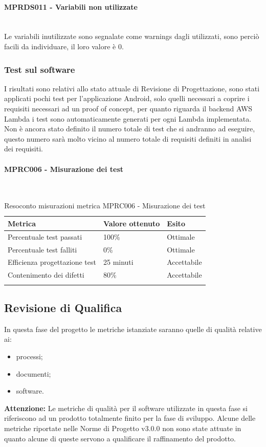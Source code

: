 \paragraph{MPRDS011 - Variabili non utilizzate}\mbox{}\\[0.4cm]
Le variabili inutilizzate sono segnalate come warnings dagli  utilizzati, sono perciò facili da individuare, il loro valore è 0.
\subsubsection{Test sul software}
I risultati sono relativi allo stato attuale di Revisione di Progettazione, sono stati applicati pochi test per l'applicazione Android, solo quelli necessari a coprire i requisiti necessari ad un proof of concept, per quanto riguarda il backend AWS Lambda i test sono automaticamente generati per ogni Lambda implementata. Non è ancora stato definito il numero totale di test che si andranno ad eseguire, questo numero sarà molto vicino al numero totale di requisiti definiti in analisi dei requisiti.
\paragraph{MPRC006 - Misurazione dei test}\mbox{}\\[0.4cm]
\begin{center}
	\centering
	\renewcommand{\arraystretch}{1.5}
	\begin{longtable}{  p{5cm}  p{5cm} p{3cm}  }
		\rowcolor{tableHeadYellow}
		\textbf{Metrica}   & \textbf{Valore ottenuto} & \textbf{Esito} \\ 
		\endhead
		Percentuale test passati     & 100\%  & Ottimale \\
		Percentuale test falliti     & 0\% & Ottimale \\
		Efficienza progettazione test    & 25 minuti & Accettabile \\
		Contenimento dei difetti    & 80\% & Accettabile \\
		\rowcolor{white}
		\caption{Resoconto misurazioni metrica MPRC006 - Misurazione dei test}
	\end{longtable}
\end{center}

\clearpage
\subsection{Revisione di Qualifica}
\label{sec:revisione_qualifica}
In questa fase del progetto le metriche istanziate saranno quelle di qualità relative ai:
\begin{itemize}
	\item processi;
	\item documenti;
	\item software.
\end{itemize}
\textbf{Attenzione:} Le metriche di qualità per il software utilizzate in questa fase si riferiscono ad un prodotto totalmente finito per la fase di sviluppo. Alcune delle metriche riportate nelle Norme di Progetto v3.0.0 non sono state attuate in quanto alcune di queste servono a qualificare il raffinamento del prodotto.
